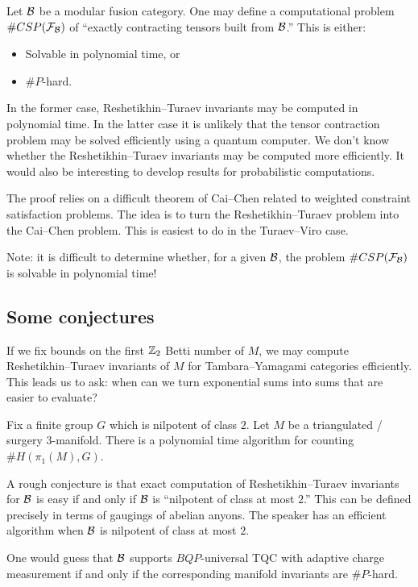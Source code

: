 \documentclass{amsart}
\begin{document}
Let $\mathcal{B}$ be a modular fusion category.
One may define a computational problem $\#CSP(\mathcal{F}_{\mathcal{B}})$ of ``exactly contracting tensors built from $\mathcal{B}$.''
This is either:
\begin{itemize}
  \item Solvable in polynomial time, or
  \item $\#P$-hard.
\end{itemize}
In the former case, Reshetikhin--Turaev invariants may be computed in polynomial time.
In the latter case it is unlikely that the tensor contraction problem may be solved efficiently using a quantum computer.
We don't know whether the Reshetikhin--Turaev invariants may be computed more efficiently.
It would also be interesting to develop results for probabilistic computations.

The proof relies on a difficult theorem of Cai--Chen related to weighted constraint satisfaction problems.
The idea is to turn the Reshetikhin--Turaev problem into the Cai--Chen problem.
This is easiest to do in the Turaev--Viro case.

Note: it is difficult to determine whether, for a given $\mathcal{B}$, the problem $\#CSP(\mathcal{F}_{\mathcal{B}})$ is solvable in polynomial time!

\subsection{Some conjectures}

If we fix bounds on the first $\mathbb{Z}_2$ Betti number of $M$, we may compute Reshetikhin--Turaev invariants of $M$ for Tambara--Yamagami categories efficiently.
This leads us to ask: when can we turn exponential sums into sums that are easier to evaluate?

\begin{thm}[S]
  Fix a finite group $G$ which is nilpotent of class $2$.
  Let $M$ be a triangulated / surgery $3$-manifold.
  There is a polynomial time algorithm for counting $\#H(\pi_1(M), G)$.
\end{thm}

A rough conjecture is that exact computation of Reshetikhin--Turaev invariants for $\mathcal{B}$ is easy if and only if $\mathcal{B}$ is ``nilpotent of class at most $2$.''
This can be defined precisely in terms of gaugings of abelian anyons.
The speaker has an efficient algorithm when $\mathcal{B}$ is nilpotent of class at most $2$.

One would guess that $\mathcal{B}$ supports $BQP$-universal TQC with adaptive charge measurement if and only if the corresponding manifold invariants are $\#P$-hard.
\end{document}
